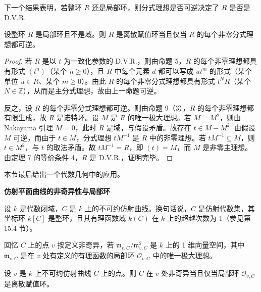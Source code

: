下一个结果表明，若整环 \(R\) 还是局部环，则分式理想是否可逆决定了 \(R\) 是否是 D.V.R.

\begin{proposition}\label{pro:16.11}
设整环 \(R\) 是局部环且不是域。则 \(R\) 是离散赋值环当且仅当 \(R\) 的每个非零分式理想都可逆。
\end{proposition}

\begin{proof}
若 \(R\) 是以 \(t\) 为一致化参数的 D.V.R.，则由命题 5，\(R\) 的每个非零理想都具有形式 \((t^n)\)（某个 \(n \geq 0\)），且 \(R\) 中每个元素 \(d\) 都可以写成 \(ut^m\) 的形式（某个单位 \(u \in R\)、某个 \(m \geq 0\)）。由此 \(R\) 的每个非零分式理想都具有形式 \(t^NR\)（某个 \(N \in \mathbb{Z}\)），从而是主分式理想，故由上一命题可逆。

反之，设 \(R\) 的每个非零分式理想都可逆。则由命题 9（3），\(R\) 的每个非零理想都有限生成，故 \(R\) 是诺特环。设 \(M\) 是 \(R\) 的唯一极大理想。若 \(M = M^2\)，则由 Nakayama 引理 \(M = 0\)，此时 \(R\) 是域，与假设矛盾。故存在 \(t \in M-M^2\). 由假设 \(M\) 可逆，而由于 \(t \in M\)，分式理想 \(tM^{-1}\) 是 \(R\) 中的非零理想。若 \(tM^{-1} \subseteq M\)，则 \(t \in M^2\)，与 \(t\) 的取法矛盾。故 \(tM^{-1} = R\)，即 \((t) = M\)，而 \(M\) 是非零主理想。由定理 7 的等价条件 4，\(R\) 是 D.V.R.，证明完毕。
\end{proof}

本节最后给出一个代数几何中的应用。

\noindent\textbf{仿射平面曲线的非奇异性与局部环}

设 \(k\) 是代数闭域，\(C\) 是 \(k\) 上的不可约仿射曲线。换句话说，\(C\) 是仿射代数集，其坐标环 \(k[C]\) 是整环，且其有理函数域 \(k(C)\) 在 \(k\) 上的超越次数为 1（参见第 15.4 节）。

回忆 \(C\) 上的点 \(v\) 按定义非奇异，若 \(\mathfrak{m}_{v,C}/\mathfrak{m}_{v,C}^2\) 是 \(k\) 上的 1 维向量空间，其中 \(\mathfrak{m}_{v,C}\) 是在 \(v\) 处有定义的有理函数的局部环 \(\mathcal{O}_{v,C}\) 中的唯一极大理想。

\begin{proposition}\label{pro:16.12}
设 \(v\) 是 \(k\) 上不可约仿射曲线 \(C\) 上的点。则 \(C\) 在 \(v\) 处非奇异当且仅当局部环 \(\mathcal{O}_{v,C}\) 是离散赋值环。
\end{proposition}

